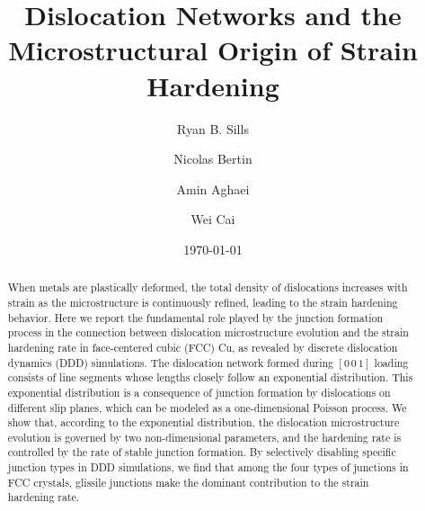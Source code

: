 \documentclass[%
reprint,
 amsmath,amssymb,
 aps,
superscriptaddress,
]{revtex4-1}
\begin{document}

\title{Dislocation Networks and the Microstructural Origin of  Strain Hardening}

\author{Ryan B. Sills}
%
%

\author{Nicolas Bertin}
\author{Amin Aghaei}
\author{Wei Cai}%
%

\date{\today}


\begin{abstract} 
%  
When metals are plastically deformed, the total density of dislocations
increases with strain as the microstructure is continuously refined, leading to
the strain hardening behavior.
%
Here we report the fundamental role played by the junction formation process in
the connection between dislocation microstructure evolution and the strain
hardening rate in face-centered cubic (FCC) Cu, as revealed by discrete
dislocation dynamics (DDD) simulations.
%
The dislocation network formed during $[0\,0\,1]$ loading consists of line
segments whose lengths closely follow an exponential distribution.
%
This exponential distribution is a consequence of junction formation by
dislocations on different slip planes, which can be modeled as a
one-dimensional Poisson process.
%
We show that, according to the exponential distribution, the dislocation
microstructure evolution is governed by two non-dimensional parameters, and the
hardening rate is controlled by the rate of stable junction formation.
%    
%
%
By selectively disabling specific junction types in DDD simulations, we find 
that among the four types of junctions in FCC crystals, glissile junctions make 
the dominant contribution to the strain hardening rate.
%
\end{abstract}
\end{document}
